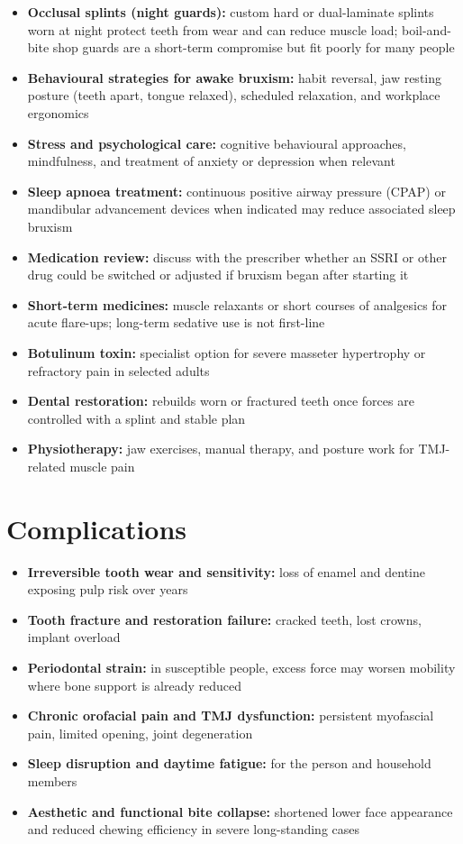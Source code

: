 \begin{itemize}
    \item \textbf{Occlusal splints (night guards):} custom hard or dual-laminate splints worn at night protect teeth from wear and can reduce muscle load; boil-and-bite shop guards are a short-term compromise but fit poorly for many people
    \item \textbf{Behavioural strategies for awake bruxism:} habit reversal, jaw resting posture (teeth apart, tongue relaxed), scheduled relaxation, and workplace ergonomics
    \item \textbf{Stress and psychological care:} cognitive behavioural approaches, mindfulness, and treatment of anxiety or depression when relevant
    \item \textbf{Sleep apnoea treatment:} continuous positive airway pressure (CPAP) or mandibular advancement devices when indicated may reduce associated sleep bruxism
    \item \textbf{Medication review:} discuss with the prescriber whether an SSRI or other drug could be switched or adjusted if bruxism began after starting it
    \item \textbf{Short-term medicines:} muscle relaxants or short courses of analgesics for acute flare-ups; long-term sedative use is not first-line
    \item \textbf{Botulinum toxin:} specialist option for severe masseter hypertrophy or refractory pain in selected adults
    \item \textbf{Dental restoration:} rebuilds worn or fractured teeth once forces are controlled with a splint and stable plan
    \item \textbf{Physiotherapy:} jaw exercises, manual therapy, and posture work for TMJ-related muscle pain
\end{itemize}

\section*{Complications}
\begin{itemize}
    \item \textbf{Irreversible tooth wear and sensitivity:} loss of enamel and dentine exposing pulp risk over years
    \item \textbf{Tooth fracture and restoration failure:} cracked teeth, lost crowns, implant overload
    \item \textbf{Periodontal strain:} in susceptible people, excess force may worsen mobility where bone support is already reduced
    \item \textbf{Chronic orofacial pain and TMJ dysfunction:} persistent myofascial pain, limited opening, joint degeneration
    \item \textbf{Sleep disruption and daytime fatigue:} for the person and household members
    \item \textbf{Aesthetic and functional bite collapse:} shortened lower face appearance and reduced chewing efficiency in severe long-standing cases
\end{itemize}

